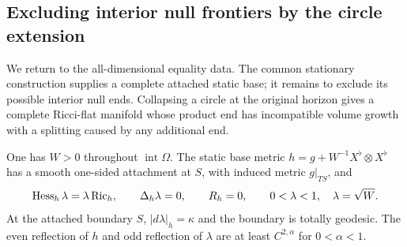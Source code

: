 \subsection{Excluding interior null frontiers by the circle extension}

We return to the all-dimensional equality data.  The common
stationary construction supplies a complete attached static base;
it remains to exclude its possible interior null ends.  Collapsing
a circle at the original horizon gives a complete Ricci-flat
manifold whose product end has incompatible volume growth with a
splitting caused by any additional end.

\begin{proposition}\label{prop:static:positive}
One has $W>0$ throughout $\operatorname{int}\Omega$.  The static
base metric $h=g+W^{-1}X^\flat\otimes X^\flat$ has a smooth
one-sided attachment at $S$, with induced metric $g|_{TS}$, and
\begin{equation}\label{eq:static:static-equations}
 \operatorname{Hess}_h\lambda=\lambda\operatorname{Ric}_h,\qquad
 \Delta_h\lambda=0,\qquad R_h=0,\qquad
 0<\lambda<1,\quad \lambda=\sqrt W.
\end{equation}
At the attached boundary $S$, $|d\lambda|_h=\kappa$ and the
boundary is totally geodesic.  The even reflection of $h$ and odd
reflection of $\lambda$ are at least $C^{2,\alpha}$ for
$0<\alpha<1$.
\end{proposition}

